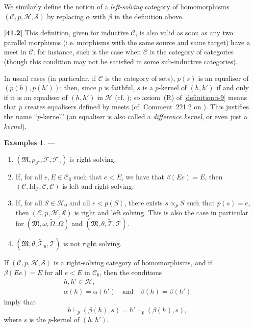 \documentclass[a4paper,fleqn]{article}
\theoremstyle{plain}
\newenvironment{proposition}[1]
  {\renewcommand\theinnerproposition{#1}\innerproposition}
  {\endinnerproposition}
\theoremstyle{definition}
\newtheorem*{examples}{Examples}
\newenvironment{longcomm}[1]
  {\noindent\textbf{[#1]}\rmfamily}
  {}
\newcommand{\oldpage}[1]{{\marginpar{\footnotesize$\bigg\vert$\,\,\,\,\textit{p.~#1}}}}
\newcommand{\textand}{\quad\text{and}\quad}
\newcommand{\CC}{\mathcal{C}}
\newcommand{\HH}{\mathcal{H}}
\renewcommand{\SS}{\mathcal{S}}
\newcommand{\MM}{\mathfrak{M}}
\newcommand{\FF}{\mathcal{F}}
\newcommand{\TT}{\mathcal{T}}
\newcommand{\tTT}{\widetilde{\TT}}
\newcommand{\subs}{\mathrel{\propto}}
\newcommand{\Id}{\mathrm{Id}}
\begin{document}
We similarly define the notion of a \emph{left-solving} category of homomorphisms $(\CC,p,\HH,\SS)$ by replacing $\alpha$ with $\beta$ in the definition above.

\begin{longcomm}{41.2}
  This definition, given for inductive $\CC$, is also valid as soon as any two parallel morphisms (i.e. morphisms with the same source and same target) have a meet in $\CC$;
  for instance, such is the case when $\CC$ is the category of categories (though this condition may not be satisfied in some sub-inductive categories).

  In usual cases (in particular, if $\CC$ is the category of sets), $p(s)$ is an equaliser of $(p(h),p(h'))$;
  then, since $p$ is faithful, $s$ is a $p$-kernel of $(h,h')$ if and only if it is an equaliser of $(h,h')$ in $\HH$ (cf. \cite[Proposition~3.1]{coll109});
  so axiom~(R) of \cref{definition:i-9} means that $p$ creates equalisers defined by meets (cf. Comment~221.2 on \cite{coll100}).
  This justifies the name ``$p$-kernel'' (an equaliser is also called a \emph{difference kernel}, or even just a \emph{kernel}).
\end{longcomm}

\begin{examples}
  ---
  \begin{enumerate}
    \item[\normalfont(1)]
      $(\MM,p_\FF,\FF,\FF_\gamma)$ is right solving.

    \item[\normalfont(2)]
      If, for all $e,E\in\CC_0$ such that $e<E$, we have that $\beta(Ee)=E$, then $(\CC,\Id_\CC,\CC,\CC)$ is left and right solving.

    \item[\normalfont(3)]
      If, for all $S\in\HH_0$ and all $e<p(S)$, there exists $s\subs_p S$ such that $p(s)=e$, then $(\CC,p,\HH,\SS)$ is right and left solving.
      This is also the case in particular for $(\MM,\omega,\widetilde{\Omega},\Omega)$ and $(\MM,\theta,\tTT,\TT)$.

    \item[\normalfont(4)]
      \oldpage{370}
      $(\MM,\theta,\tTT_u,\TT)$ is not right solving.
  \end{enumerate}
\end{examples}

\begin{proposition}{11}
\label{proposition:i-11}
  If $(\CC,p,\HH,\SS)$ is a right-solving category of homomorphisms, and if $\beta(Ee)=E$ for all $e<E$ in $\CC_0$, then the conditions
  \[
    \begin{gathered}
      h,h'\in\HH,
    \\\alpha(h)=\alpha(h')
      \textand
      \beta(h)=\beta(h')
    \end{gathered}
  \]
  imply that
  \[
    h\vdash_p(\beta(h),s)
    = h'\vdash_p(\beta(h),s),
  \]
  where $s$ is the $p$-kernel of $(h,h')$.
\end{proposition}
\end{document}

